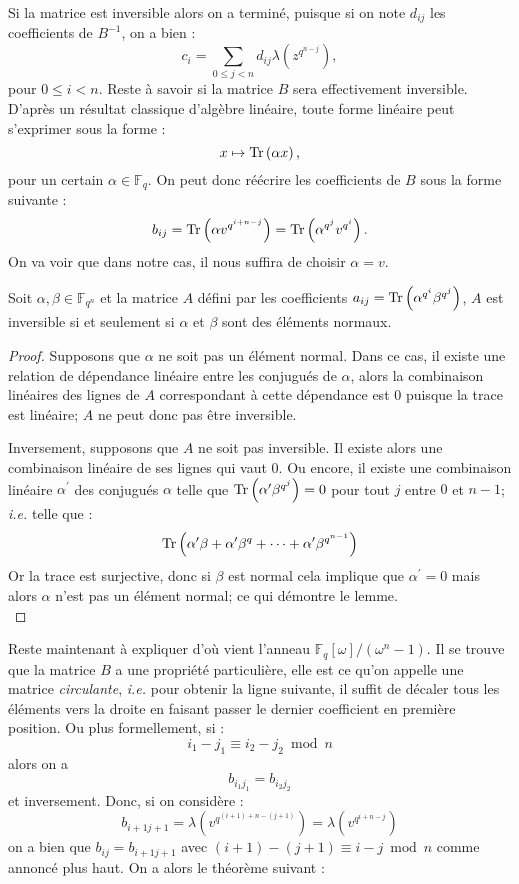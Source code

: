 \documentclass[a4paper]{article} %
\numberwithin{section}{part}
\numberwithin{equation}{section}
\newcommand\GF[1]{\mathbb{F}_{#1}}
\newcommand\Tr[1]{\textup{Tr}\left(#1\right)}
\begin{document}
Si la matrice est inversible alors on a terminé, puisque si on note $d_{ij}$ les
coefficients de $B^{-1}$, on a bien :
\begin{equation}
c_i = \sum_{0\leq j < n}{d_{ij}\lambda\left(z^{q^{n-j}}\right)},
\end{equation}
pour $0\leq i < n$. Reste à savoir si la matrice $B$ sera effectivement 
inversible.
D'après un résultat classique d'algèbre linéaire, toute forme linéaire peut
s'exprimer sous la forme :
\begin{equation}
x \mapsto \Tr{\alpha x},
\end{equation}
pour un certain $\alpha\in\GF{q}$. On peut donc réécrire les coefficients de $B$
sous la forme suivante :
\begin{equation}
b_{ij} = \Tr{\alpha v^{q^{i+n-j}}} = \Tr{\alpha^{q^j}v^{q^i}}.
\end{equation}
On va voir que dans notre cas, il nous suffira de choisir $\alpha = v$.

\begin{lem}
\label{lem:mattrinv}
Soit $\alpha,\beta\in\GF{q^n}$ et la matrice $A$ défini par les coefficients 
$a_{ij} = \Tr{\alpha^{q^i}\beta^{q^j}}$, $A$ est inversible si et seulement si 
$\alpha$ et $\beta$ sont des éléments normaux.
\end{lem}
\begin{proof}
Supposons que $\alpha$ ne soit pas un élément normal. Dans ce cas, il existe une
relation de dépendance linéaire entre les conjugués de $\alpha$, alors la 
combinaison linéaires des lignes de $A$ correspondant à cette dépendance est $0$
puisque la trace est linéaire; $A$ ne peut donc pas être inversible.\par
Inversement, supposons que $A$ ne soit pas inversible. Il existe alors une 
combinaison linéaire de ses lignes qui vaut $0$. Ou encore, il existe une 
combinaison linéaire $\alpha^{\prime}$ des conjugués $\alpha$ telle que 
$\Tr{\alpha^{\prime}\beta^{q^j}} = 0$ pour tout $j$ entre $0$ et $n-1$; 
\textit{i.e.} telle que :
\[\Tr{\alpha^{\prime}\beta + \alpha^{\prime}\beta^q + \dots + 
\alpha^{\prime}\beta^{q^{n-1}}}\]
Or la trace est surjective, donc si $\beta$ est normal cela implique que 
$\alpha^{\prime} = 0$ mais alors $\alpha$ n'est pas un élément normal; ce qui 
démontre le lemme.\\
\end{proof}
Reste maintenant à expliquer d'où vient l'anneau 
$\mathbb{F}_q[\omega]/(\omega^n - 1)$. Il se trouve que la matrice $B$ a une 
propriété particulière, elle est ce qu'on appelle une matrice \emph{circulante},
\textit{i.e.} pour obtenir la ligne suivante, il suffit de décaler tous les 
éléments vers la droite en faisant passer le dernier coefficient en première 
position. Ou plus formellement, si :
\[i_1 - j_1 \equiv i_2 - j_2 \bmod n\]
alors on a 
\[b_{i_1j_1} = b_{i_2j_2}\]
et inversement. Donc, si on considère :
\[b_{i+1j+1} = \lambda\left(v^{q^{(i+1) + n - (j+1)}}\right) = 
\lambda\left(v^{q^{i+n-j}}\right)\]
on a bien que $b_{ij} = b_{i+1j+1}$ avec $(i+1) - (j+1) \equiv i - j \bmod n$ 
comme annoncé plus haut. On a alors le théorème suivant :
\end{document}
